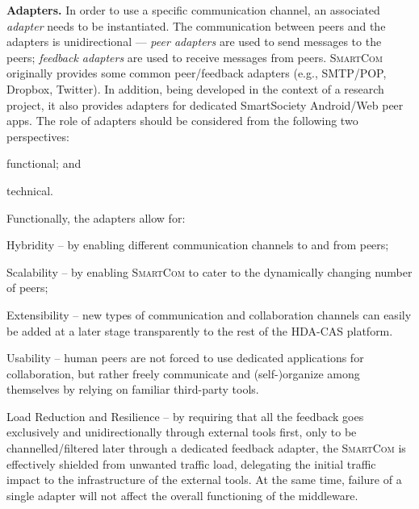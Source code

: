 \documentclass{llncs}
\newcommand{\mdl}{\textsc{SmartCom}}
\begin{document}
  \textbf{Adapters. }
    In order to use a specific communication channel, an associated \emph{adapter} needs to be instantiated. The communication between peers and the adapters is unidirectional --- \emph{peer adapters} are used to send messages to the peers; \emph{feedback adapters} are used to receive messages from peers. 
    \mdl{} originally provides some common peer/feedback adapters  (e.g., SMTP/POP, Dropbox, Twitter). In addition, being developed in the context of a research project, it also provides adapters for dedicated SmartSociety Android/Web peer apps. 
    The role of adapters should be considered from the following two perspectives:
    \begin{inparaenum}[\itshape 1)]
    \item functional; and 
    \item technical.
    \end{inparaenum}
    
    Functionally, the adapters allow for:
    \begin{inparaenum}[\itshape a)]
    \item Hybridity -- by enabling different communication channels to and from peers;
    \item Scalability -- by enabling \mdl{} to cater to the dynamically changing number of peers;
    \item Extensibility -- new types of communication and collaboration channels can easily be added at a later stage transparently to the rest of the HDA-CAS platform.
    \item Usability -- human peers are not forced to use dedicated applications for collaboration, but rather freely communicate and (self-)organize among themselves by relying on familiar third-party tools.
    \item Load Reduction and Resilience -- by requiring that all the feedback goes exclusively and unidirectionally through external tools first, only to be channelled/filtered later through a dedicated feedback adapter, the \mdl{} is effectively shielded from unwanted traffic load, delegating the initial traffic impact to the infrastructure of the external tools. At the same time, failure of a single adapter will not affect the overall functioning of the middleware.
    \end{inparaenum}
\end{document}
